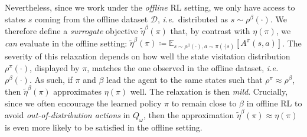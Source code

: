 Nevertheless, since we work under the \emph{offline} RL setting, we only have access to states $s$ coming from
the offline dataset $\mathcal{D}$, \textit{i.e.}~distributed as $s \sim \rho^\beta(\cdot)$.
We therefore define a \emph{surrogate} objective $\tilde{\eta}^\beta(\pi)$ that, by contrast with $\eta(\pi)$,
we \emph{can} evaluate in the offline setting:
$\tilde{\eta}^\beta (\pi) \coloneqq \mathbb{E}_{s \sim \rho^\beta(\cdot), a \sim \pi(\cdot | s)}[A^\pi(s,a)]$.
The severity of this relaxation depends on how well
the state visitation distribution $\rho^\pi(\cdot)$, displayed by $\pi$, matches the one
observed in the offline dataset, \textit{i.e.}~$\rho^\beta(\cdot)$.
As such, if $\pi$ and $\beta$ lead the agent to the same states
such that $\rho^\pi \approx \rho^\beta$,
then $\tilde{\eta}^\beta(\pi)$ approximates $\eta(\pi)$ well.
The relaxation is then \emph{mild}.
Crucially, since we often encourage the learned policy $\pi$ to remain close to $\beta$ in offline RL to
avoid \textit{out-of-distribution actions} in $Q_\omega$, then the approximation
$\tilde{\eta}^\beta(\pi) \approx \eta(\pi)$
is even more likely to be satisfied in the offline setting.

